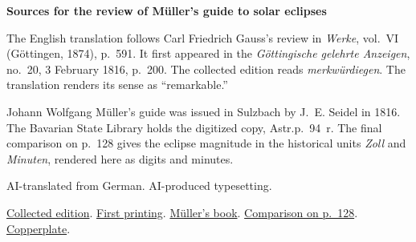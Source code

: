 \clearpage\thispagestyle{empty}
\begin{center}\Large\bfseries Sources for the review of Müller’s guide to solar eclipses\end{center}

The English translation follows Carl Friedrich Gauss’s review in \emph{Werke}, vol.~VI (Göttingen, 1874), p.~591. It first appeared in the \emph{Göttingische gelehrte Anzeigen}, no.~20, 3 February 1816, p.~200. The collected edition reads \emph{merkwürdiegen}. The translation renders its sense as “remarkable.”

Johann Wolfgang Müller’s guide was issued in Sulzbach by J.~E. Seidel in 1816. The Bavarian State Library holds the digitized copy, Astr.p.~94~r. The final comparison on p.~128 gives the eclipse magnitude in the historical units \emph{Zoll} and \emph{Minuten}, rendered here as digits and minutes.

AI-translated from German. AI-produced typesetting.

\href{https://gdz.sub.uni-goettingen.de/id/PPN236007467}{Collected edition}. \href{https://images.p.sub.uni-goettingen.de/iiif/image/gdz:PPN319721507_1816:00000202/full/1650,/0/default.jpg}{First printing}. \href{https://mdz-nbn-resolving.de/urn:nbn:de:bvb:12-bsb10060601-5}{Müller’s book}. \href{https://api.digitale-sammlungen.de/iiif/image/v2/bsb10060601_00130/full/1500,/0/default.jpg}{Comparison on p.~128}. \href{https://api.digitale-sammlungen.de/iiif/image/v2/bsb10060601_00131/full/1500,/0/default.jpg}{Copperplate}.

\clearpage
